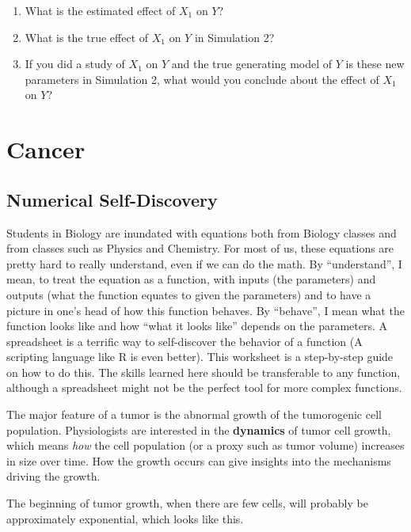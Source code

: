 \documentclass[]{book}
\providecommand{\tightlist}{%
  \setlength{\itemsep}{0pt}\setlength{\parskip}{0pt}}
\begin{document}
\begin{enumerate}
\def\labelenumi{\arabic{enumi}.}
\setcounter{enumi}{7}
\tightlist
\item
  What is the estimated effect of \(X_1\) on \(Y\)?
\item
  What is the true effect of \(X_1\) on \(Y\) in Simulation 2?
\item
  If you did a study of \(X_1\) on \(Y\) and the true generating model
  of \(Y\) is these new parameters in Simulation 2, what would you
  conclude about the effect of \(X_1\) on \(Y\)?
\end{enumerate}

\chapter{Cancer}\label{cancer}

\section{Numerical Self-Discovery}\label{numerical-self-discovery}

Students in Biology are inundated with equations both from Biology
classes and from classes such as Physics and Chemistry. For most of us,
these equations are pretty hard to really understand, even if we can do
the math. By ``understand'', I mean, to treat the equation as a
function, with inputs (the parameters) and outputs (what the function
equates to given the parameters) and to have a picture in one's head of
how this function behaves. By ``behave'', I mean what the function looks
like and how ``what it looks like'' depends on the parameters. A
spreadsheet is a terrific way to self-discover the behavior of a
function (A scripting language like R is even better). This worksheet is
a step-by-step guide on how to do this. The skills learned here should
be transferable to any function, although a spreadsheet might not be the
perfect tool for more complex functions.

The major feature of a tumor is the abnormal growth of the tumorogenic
cell population. Physiologists are interested in the \textbf{dynamics}
of tumor cell growth, which means \emph{how} the cell population (or a
proxy such as tumor volume) increases in size over time. How the growth
occurs can give insights into the mechanisms driving the growth.

The beginning of tumor growth, when there are few cells, will probably
be approximately exponential, which looks like this.
\end{document}
